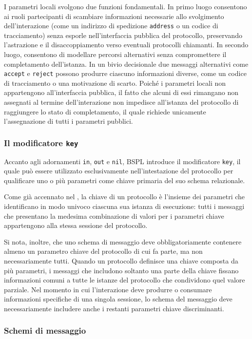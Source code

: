 I parametri locali svolgono due funzioni fondamentali. 
In primo luogo consentono ai ruoli partecipanti 
di scambiare informazioni necessarie allo svolgimento dell'interazione (come un indirizzo di spedizione 
\texttt{address} o un codice di tracciamento) senza esporle nell'interfaccia pubblica del protocollo, 
preservando l'astrazione e il disaccoppiamento verso eventuali protocolli chiamanti. 
In secondo luogo, consentono di modellare percorsi alternativi senza compromettere il completamento dell'istanza.
In un bivio decisionale due messaggi alternativi come \texttt{accept} e \texttt{reject} possono
produrre ciascuno informazioni diverse, come un codice di tracciamento o una motivazione di scarto.
Poiché i parametri locali non appartengono all'interfaccia pubblica, il fatto che alcuni di essi rimangano
non assegnati al termine dell'interazione non impedisce all'istanza del protocollo di raggiungere lo stato di
completamento, il quale richiede unicamente l'assegnazione di tutti i parametri pubblici.

\subsubsection{Il modificatore \texttt{key}}\label{bspl:key}
Accanto agli adornamenti \texttt{in}, \texttt{out} e \texttt{nil}, BSPL introduce il modificatore \texttt{key}, il quale può essere
utilizzato esclusivamente nell'intestazione del protocollo per qualificare uno o più parametri come chiave 
primaria del suo schema relazionale.

Come già accennato nel , la chiave di un protocollo è l'insieme dei parametri 
che identificano in modo univoco ciascuna sua istanza di esecuzione: tutti i messaggi che presentano 
la medesima combinazione di valori per i parametri chiave appartengono alla stessa sessione del protocollo.

Si nota, inoltre, che uno schema di messaggio deve obbligatoriamente contenere almeno un parametro chiave del protocollo di cui fa parte,
ma non necessariamente tutti. Quando un protocollo definisce una chiave composta da più parametri, i messaggi che
includono soltanto una parte della chiave fissano informazioni comuni a tutte le istanze del protocollo che condividono quel valore parziale.
Nel momento in cui l'interazione deve produrre o consumare informazioni specifiche di una singola sessione, lo schema
del messaggio deve necessariamente includere anche i restanti parametri chiave discriminanti.

\subsubsection{Schemi di messaggio}\label{bspl:schemi-messaggio}

